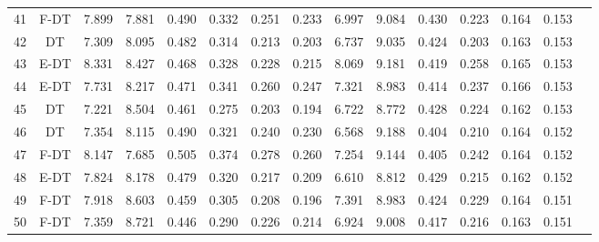 \begin{longtable}{@{\hskip3pt}c@{\hskip3pt}c@{\hskip3pt}c@{\hskip3pt}c@{\hskip3pt}c@{\hskip3pt}c@{\hskip3pt}c@{\hskip3pt}c@{\hskip3pt}c@{\hskip3pt}c@{\hskip3pt}c@{\hskip3pt}c@{\hskip3pt}c@{\hskip3pt}c@{\hskip3pt}c}
         41 &           F-DT &             7.899 &       7.881 &         0.490 &       0.332 &       0.251 &        0.233 &               6.997 &       9.084 &         0.430 &       0.223 &       0.164 &        0.153 \\
         42 &             DT &             7.309 &       8.095 &         0.482 &       0.314 &       0.213 &        0.203 &               6.737 &       9.035 &         0.424 &       0.203 &       0.163 &        0.153 \\
         43 &           E-DT &             8.331 &       8.427 &         0.468 &       0.328 &       0.228 &        0.215 &               8.069 &       9.181 &         0.419 &       0.258 &       0.165 &        0.153 \\
         44 &           E-DT &             7.731 &       8.217 &         0.471 &       0.341 &       0.260 &        0.247 &               7.321 &       8.983 &         0.414 &       0.237 &       0.166 &        0.153 \\
         45 &             DT &             7.221 &       8.504 &         0.461 &       0.275 &       0.203 &        0.194 &               6.722 &       8.772 &         0.428 &       0.224 &       0.162 &        0.153 \\
         46 &             DT &             7.354 &       8.115 &         0.490 &       0.321 &       0.240 &        0.230 &               6.568 &       9.188 &         0.404 &       0.210 &       0.164 &        0.152 \\
         47 &           F-DT &             8.147 &       7.685 &         0.505 &       0.374 &       0.278 &        0.260 &               7.254 &       9.144 &         0.405 &       0.242 &       0.164 &        0.152 \\
         48 &           E-DT &             7.824 &       8.178 &         0.479 &       0.320 &       0.217 &        0.209 &               6.610 &       8.812 &         0.429 &       0.215 &       0.162 &        0.152 \\
         49 &           F-DT &             7.918 &       8.603 &         0.459 &       0.305 &       0.208 &        0.196 &               7.391 &       8.983 &         0.424 &       0.229 &       0.164 &        0.151 \\
         50 &           F-DT &             7.359 &       8.721 &         0.446 &       0.290 &       0.226 &        0.214 &               6.924 &       9.008 &         0.417 &       0.216 &       0.163 &        0.151 \\

\end{longtable}
